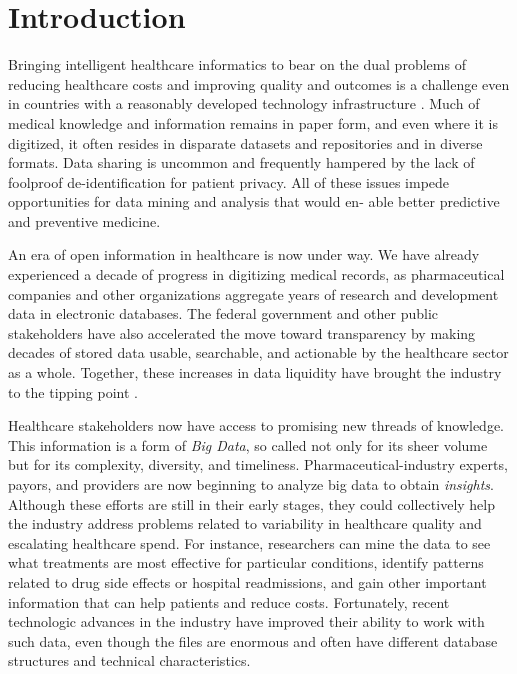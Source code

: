 \documentclass[twocolumn]{article}
\begin{document}
\section{Introduction}
Bringing intelligent healthcare informatics to bear on the dual problems of reducing healthcare costs and improving quality and outcomes is a challenge even in countries with a reasonably developed technology infrastructure \cite{Hey:2009}. Much of medical knowledge and information remains in paper form, and even where it is digitized, it often resides in disparate datasets and repositories and in diverse formats. Data sharing is uncommon and frequently hampered by the lack of foolproof de-identification for patient privacy. All of these issues impede opportunities for data mining and analysis that would en- able better predictive and preventive medicine.

An era of open information in healthcare is now under way. We have already experienced a decade of progress in digitizing medical records, as pharmaceutical companies and other organizations aggregate years of research and development data in electronic databases. The federal government and other public stakeholders have also accelerated the move toward transparency by making decades of stored data usable, searchable, and actionable by the healthcare sector as a whole. Together, these increases in data liquidity have brought the industry to the tipping point \cite{Groves:2013}.

Healthcare stakeholders now have access to promising new threads of knowledge. This information is a form of  \textit{Big Data}, so called not only for its sheer volume but for its complexity, diversity, and timeliness. 
Pharmaceutical-industry experts, payors, and providers are now beginning to analyze big data to obtain \textit{insights}.
Although these efforts are still in their early stages, they could collectively help the industry address problems related to variability in healthcare quality and escalating healthcare spend. 
For instance, researchers can mine the data to see what treatments are most effective for particular conditions, identify patterns related to drug side effects or hospital readmissions, and gain other important information that can help patients and reduce costs. Fortunately, recent technologic advances in the industry have improved their ability to work with such data, even though the files are enormous and often have different database structures and technical characteristics.
\end{document}
